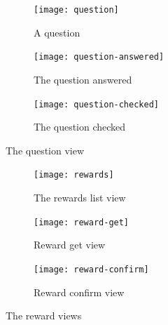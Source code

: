 \begin{figure}
\centering
\begin{subfigure}{.33\textwidth}
  \centering
  \texttt{[image: question]}
  \caption{A question}
  \label{fig:question}
\end{subfigure}%
\begin{subfigure}{.33\textwidth}
  \centering
  \texttt{[image: question-answered]}
  \caption{The question answered}
  \label{fig:question-answered}
\end{subfigure}
\begin{subfigure}{.33\textwidth}
  \centering
  \texttt{[image: question-checked]}
  \caption{The question checked}
  \label{fig:question-checked}
\end{subfigure}
\caption{The question view}
\label{fig:question-view}
\end{figure}

\begin{figure}
\centering
\begin{subfigure}{.33\textwidth}
  \centering
  \texttt{[image: rewards]}
  \caption{The rewards list view}
  \label{fig:rewards}
\end{subfigure}%
\begin{subfigure}{.33\textwidth}
  \centering
  \texttt{[image: reward-get]}
  \caption{Reward get view}
  \label{fig:reward-get}
\end{subfigure}
\begin{subfigure}{.33\textwidth}
  \centering
  \texttt{[image: reward-confirm]}
  \caption{Reward confirm view}
  \label{fig:reward-confirm}
\end{subfigure}
\caption{The reward views}
\label{fig:reward-views}
\end{figure}

